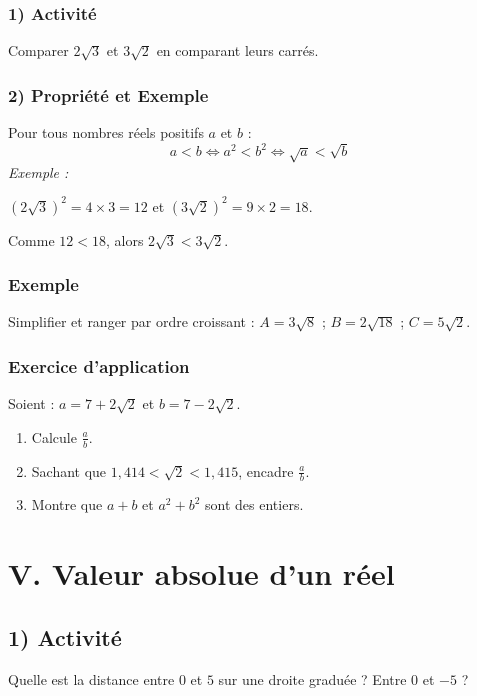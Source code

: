 \documentclass[12pt,a4paper]{article}
\begin{document}
\subsubsection*{\color{myred} 1) Activité}
Comparer $2\sqrt{3}$ et $3\sqrt{2}$ en comparant leurs carrés.

\subsubsection*{\color{myred} 2) Propriété et Exemple}
Pour tous nombres réels positifs $a$ et $b$ : 
\[
a < b \iff a^2 < b^2 \iff \sqrt{a} < \sqrt{b}
\]
\textit{Exemple :} 

$(2\sqrt{3})^2 = 4 \times 3 = 12$ et $(3\sqrt{2})^2 = 9 \times 2 = 18$. 

Comme $12 < 18$, alors $2\sqrt{3} < 3\sqrt{2}$.

\subsubsection*{\color{myred} Exemple}

Simplifier et ranger par ordre croissant : 
$A = 3\sqrt{8}$ ; $B = 2\sqrt{18}$ ; $C = 5\sqrt{2}$.
\subsubsection*{\color{myred} Exercice d’application}
Soient : $a = 7 + 2\sqrt{2}$ \quad et \quad $b = 7 - 2\sqrt{2}$.
\begin{enumerate}[label=\textbf{\arabic*)}]
    \item Calcule $\frac{a}{b}$.
    \item Sachant que $1{,}414 < \sqrt{2} < 1{,}415$, encadre $\frac{a}{b}$.
    \item Montre que $a + b$ et $a^2 + b^2$ sont des entiers.
\end{enumerate}
\section*{\color{myred}V. Valeur absolue d’un réel}

\subsection*{\color{myred} 1) Activité}
Quelle est la distance entre $0$ et $5$ sur une droite graduée ? Entre $0$ et $-5$ ?
\end{document}
